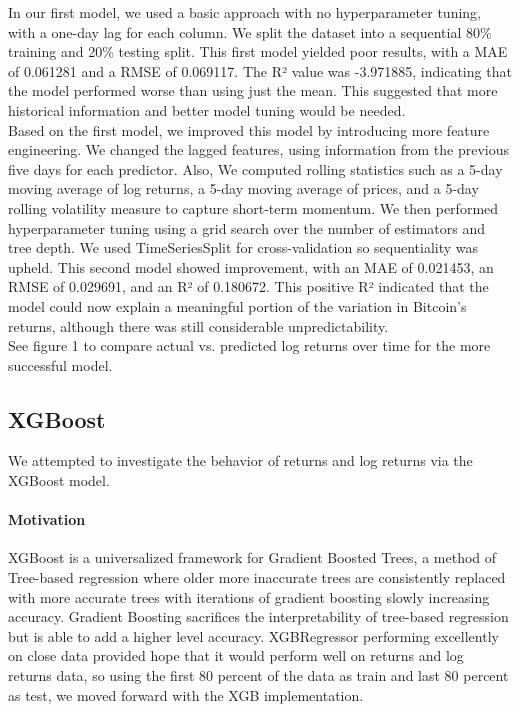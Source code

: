 \documentclass{article}
\begin{document}
In our first model, we used a basic approach with no hyperparameter tuning, with a one-day lag for each column. We split the dataset into a sequential 80\% training and 20\% testing split. This first model yielded poor results, with a MAE of 0.061281 and a RMSE of 0.069117. The R² value was -3.971885, indicating that the model performed worse than using just the mean. This suggested that more historical information and better model tuning would be needed.\\ 

Based on the first model, we improved this model by introducing more feature engineering. We changed the lagged features, using information from the previous five days for each predictor. Also, We computed rolling statistics such as a 5-day moving average of log returns, a 5-day moving average of prices, and a 5-day rolling volatility measure to capture short-term momentum. We then performed hyperparameter tuning using a grid search over the number of estimators and tree depth. We used TimeSeriesSplit for cross-validation so sequentiality was upheld. This second model showed improvement, with an MAE of 0.021453, an RMSE of 0.029691, and an R² of 0.180672. This positive R² indicated that the model could now explain a meaningful portion of the variation in Bitcoin’s returns, although there was still considerable unpredictability. \\

See figure 1 to compare actual vs. predicted log returns over time for the more successful model.

\subsection{XGBoost}
We attempted to investigate the behavior of returns and log returns via the XGBoost model.

\paragraph{Motivation}
XGBoost is a universalized framework for Gradient Boosted Trees, a method of Tree-based regression where older more inaccurate trees are consistently replaced with more accurate trees with iterations of gradient boosting slowly increasing accuracy. Gradient Boosting sacrifices the interpretability of tree-based regression but is able to add a higher level accuracy. XGBRegressor performing excellently on close data provided hope that it would perform well on returns and log returns data, so using the first 80 percent of the data as train and last 80 percent as test, we moved forward with the XGB implementation.
\end{document}
